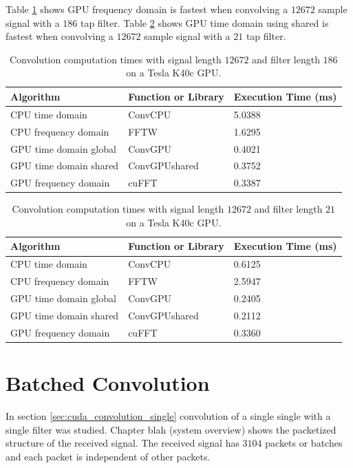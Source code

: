 Table \ref{tab:CPUvsGPUtable_12672_186} shows GPU frequency domain is fastest when convolving a $12672$ sample signal with a $186$ tap filter.
Table \ref{tab:CPUvsGPUtable_12672_21} shows GPU time domain using shared is fastest when convolving a $12672$ sample signal with a $21$ tap filter.
\begin{table}
\caption{Convolution computation times with signal length $12672$ and filter length $186$ on a Tesla K40c GPU.}
\begin{center}
\begin{tabular}{lll}
	\toprule
	Algorithm 				& Function or Library		& Execution Time (ms) \\ \midrule
	CPU time domain 		& ConvCPU 					& 5.0388		\\
	CPU frequency domain 	& FFTW 						& 1.6295		\\
	GPU time domain global 	& ConvGPU 					& 0.4021		\\
	GPU time domain shared 	& ConvGPUshared 			& 0.3752		\\
	GPU frequency domain 	& cuFFT						& 0.3387		\\ 
	\bottomrule
\end{tabular}
\end{center}
\label{tab:CPUvsGPUtable_12672_186}
\end{table}
\begin{table}
\caption{Convolution computation times with signal length $12672$ and filter length $21$ on a Tesla K40c GPU.}
\begin{center}
\begin{tabular}{lll}
	\toprule
	Algorithm 				& Function or Library		& Execution Time (ms) \\ \midrule
	CPU time domain 		& ConvCPU 					& 0.6125		\\
	CPU frequency domain 	& FFTW 						& 2.5947		\\
	GPU time domain global 	& ConvGPU 					& 0.2405		\\
	GPU time domain shared 	& ConvGPUshared 			& 0.2112		\\
	GPU frequency domain 	& cuFFT						& 0.3360		\\ 
	\bottomrule
\end{tabular}
\end{center}
\label{tab:CPUvsGPUtable_12672_21}
\end{table}

\section{Batched Convolution}
In section \ref{sec:cuda_convolution_single} convolution of a single single with a single filter was studied.
Chapter blah (system overview) shows the packetized structure of the received signal.
The received signal has $3104$ packets or batches and each packet is independent of other packets.

